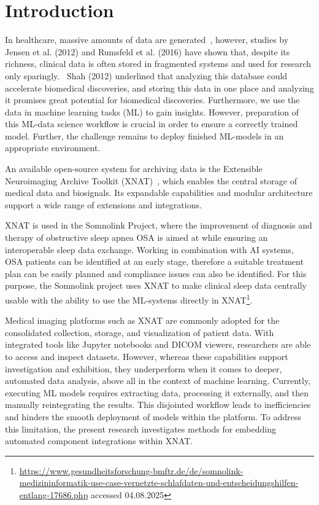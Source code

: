 
\chapter{Introduction}

In healthcare, massive amounts of data are generated~\cite{shilo_axes_2020}, however, studies by Jensen et al. (2012) and Rumsfeld et al. (2016) have shown that, despite its richness, clinical data is often stored in fragmented systems and used for research only sparingly.~\cite{jensen_mining_2012} \cite{rumsfeld_big_2016} Shah (2012) underlined that analyzing this database could accelerate biomedical 
discoveries\cite{shah_coming_2012}, and storing this data in one place and analyzing it promises great potential for biomedical discoveries. Furthermore, we use the data in machine learning tasks (\ac{ML}) to gain insights. However, preparation of this ML-data science workflow is crucial in order to ensure a correctly trained model. Further, the challenge remains to deploy finished ML-models in an appropriate environment.

An available open-source system for archiving data is the Extensible Neuroimaging Archive Toolkit (XNAT)~\cite{marcus_extensible_2007}, which enables the central storage of medical data and biosignals. Its expandable capabilities and modular architecture support a wide range of extensions and integrations.

XNAT is used in the Somnolink Project, where the improvement of diagnosis and therapy of obstructive sleep apnea \ac{OSA} is aimed at while ensuring an interoperable sleep data exchange. Working in combination with \ac{AI} systems, OSA patients can be identified at an early stage, therefore a suitable treatment plan can be easily planned and compliance issues can also be identified. For this purpose, the Somnolink project uses XNAT to make clinical sleep data centrally usable with the ability to use the ML-systems directly in XNAT\footnote{\url{https://www.gesundheitsforschung-bmftr.de/de/somnolink-medizininformatik-use-case-vernetzte-schlafdaten-und-entscheidungshilfen-entlang-17686.php}{ accessed 04.08.2025}}.

Medical imaging platforms such as XNAT are commonly adopted for the consolidated collection, storage, and visualization of patient data. With integrated tools like Jupyter notebooks and \ac{DICOM} viewers, researchers are able to access and inspect datasets. However, whereas these capabilities support investigation and exhibition, they underperform when it comes to deeper, automated data analysis, above all in the context of machine learning. Currently, executing ML models requires extracting data, processing it externally, and then manually reintegrating the results. This disjointed workflow leads to inefficiencies and hinders the smooth deployment of models within the platform. To address this limitation, the present research investigates methods for embedding automated component integrations within XNAT.

